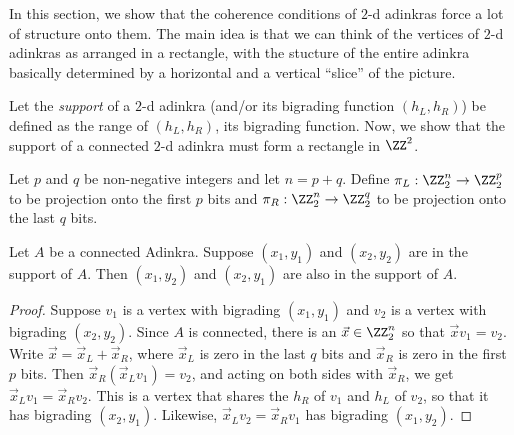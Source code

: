 
In this section, we show that the coherence conditions of $2$-d adinkras force a lot of structure onto them. The main idea is that we can think of the vertices of $2$-d adinkras as arranged in a rectangle, with the stucture of the entire adinkra basically determined by a horizontal and a vertical ``slice'' of the picture.

Let the \emph{support} of a $2$-d adinkra (and/or its bigrading function $(h_L,h_R)$) be defined as the range of $(h_L,h_R)$, its bigrading function. Now, we show that the support of a connected $2$-d adinkra must form a rectangle in $\ZZ^2$.


\begin{definition}
Let $p$ and $q$ be non-negative integers and let $n=p+q$.  Define $\pi_L:\ZZ_2^n\to\ZZ_2^p$ to be projection onto the first $p$ bits and $\pi_R:\ZZ_2^n\to\ZZ_2^q$ to be projection onto the last $q$ bits.
\end{definition}

\begin{prop}
\label{prop:rectangle-completion}
Let $A$ be a connected Adinkra.  Suppose $(x_1,y_1)$ and $(x_2,y_2)$ are in the support of $A$.  Then $(x_1,y_2)$ and $(x_2,y_1)$ are also in the support of $A$.
\end{prop}
\begin{proof}
Suppose $v_1$ is a vertex with bigrading $(x_1,y_1)$ and $v_2$ is a vertex with bigrading $(x_2,y_2)$.  Since $A$ is connected, there is an $\vec{x}\in\ZZ_2^n$ so that $\vec{x}v_1=v_2$.  Write $\vec{x}=\vec{x}_L+\vec{x}_R$, where $\vec{x}_L$ is zero in the last $q$ bits and $\vec{x}_R$ is zero in the first $p$ bits.  Then $\vec{x}_R(\vec{x}_Lv_1)=v_2$, and acting on both sides with $\vec{x}_R$, we get $\vec{x}_Lv_1=\vec{x}_Rv_2$.  This is a vertex that shares the $h_R$ of $v_1$ and $h_L$ of $v_2$, so that it has bigrading $(x_2,y_1)$.  Likewise, $\vec{x}_L v_2=\vec{x}_R v_1$ has bigrading $(x_1,y_2)$.
\end{proof}


